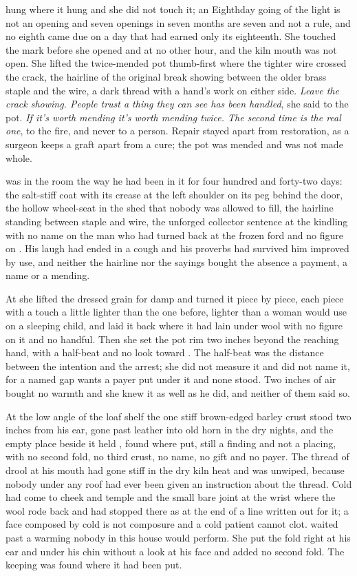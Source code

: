  hung where it hung and she did not touch it; an Eighthday going of the light is not an opening and seven openings in seven months are seven and not a rule, and no eighth came due on a day that had earned only its eighteenth. She touched the mark before she opened  and at no other hour, and the kiln mouth was not open. She lifted the twice-mended pot thumb-first where the tighter wire crossed the crack, the hairline of the original break showing between the older brass staple and the wire, a dark thread with a hand's work on either side. \emph{Leave the crack showing. People trust a thing they can see has been handled}, she said to the pot. \emph{If it's worth mending it's worth mending twice. The second time is the real one}, to the fire, and never to a person. Repair stayed apart from restoration, as a surgeon keeps a graft apart from a cure; the pot was mended and was not made whole.

 was in the room the way he had been in it for four hundred and forty-two days: the salt-stiff coat with its crease at the left shoulder on its peg behind the door, the hollow wheel-seat in the shed that nobody was allowed to fill, the hairline standing between staple and wire, the unforged collector sentence at the kindling with no name on the man who had turned back at the frozen ford and no figure on . His laugh had ended in a cough and his proverbs had survived him improved by use, and neither the hairline nor the sayings bought the absence a payment, a name or a mending.

At  she lifted the dressed grain for damp and turned it piece by piece, each piece with a touch a little lighter than the one before, lighter than a woman would use on a sleeping child, and laid it back where it had lain under wool with no figure on it and no handful. Then she set the pot rim two inches beyond the reaching hand, with a half-beat and no look toward . The half-beat was the distance between the intention and the arrest; she did not measure it and did not name it, for a named gap wants a payer put under it and none stood. Two inches of air bought no warmth and she knew it as well as he did, and neither of them said so.

At the low angle of the loaf shelf the one stiff brown-edged barley crust stood two inches from his ear, gone past leather into old horn in the dry nights, and the empty place beside it held , found where put, still a finding and not a placing, with no second fold, no third crust, no name, no gift and no payer. The thread of drool at his mouth had gone stiff in the dry kiln heat and was unwiped, because nobody under any roof had ever been given an instruction about the thread. Cold had come to cheek and temple and the small bare joint at the wrist where the wool rode back and had stopped there as at the end of a line written out for it; a face composed by cold is not composure and a cold patient cannot clot.  waited past a warming nobody in this house would perform. She put the fold right at his ear and under his chin without a look at his face and added no second fold. The keeping was found where it had been put.

